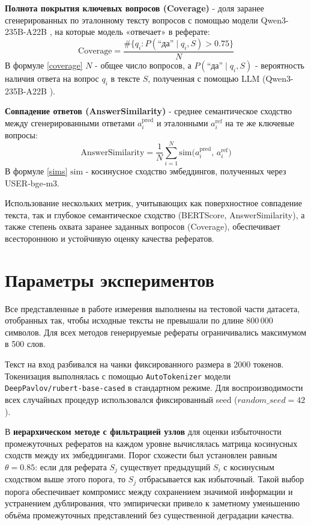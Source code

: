 \documentclass{superfri}
\begin{document}
\textbf{Полнота покрытия ключевых вопросов (Coverage)} - доля заранее сгенерированных по эталонному тексту вопросов с помощью модели Qwen3-\allowbreak 235B-\allowbreak A22B \cite{qwen3},
на которые модель «отвечает» в реферате:
\begin{equation}\label{coverage}
  \text{Coverage} = \frac{\#\{q_i\colon P(\text{“да”}\mid q_i,S)\!>\!0.75\}}{N}
\end{equation}
В формуле \eqref{coverage} $N$ - общее число вопросов, а $P(\text{“да”}\mid q_i,S)$ - вероятность наличия ответа на вопрос $q_i$ в тексте $S$, 
полученная с помощью LLM (Qwen3-\allowbreak 235B-\allowbreak A22B \cite{qwen3}).

\textbf{Совпадение ответов (AnswerSimilarity)} - среднее семантическое сходство между сгенерированными ответами $a_i^{\text{pred}}$ и эталонными $a_i^{\text{ref}}$ на те же ключевые вопросы:
\begin{equation}\label{sims}
  \text{AnswerSimilarity} = \frac{1}{N}\sum_{i=1}^N \mathrm{sim}\bigl(a_i^{\text{pred}},\,a_i^{\text{ref}}\bigr)
\end{equation}
В формуле \eqref{sims} $\mathrm{sim}$ - косинусное сходство эмбеддингов, полученных через USER‑bge‑m3.


Использование нескольких метрик, учитывающих как поверхностное совпадение текста, так и глубокое семантическое сходство (BERTScore, AnswerSimilarity), 
а также степень охвата заранее заданных вопросов (Coverage), обеспечивает всестороннюю и устойчивую оценку качества рефератов.

\section{Параметры экспериментов}

Все представленные в работе измерения выполнены на тестовой части датасета, 
отобранных так, чтобы исходные тексты не превышали по длине 800\,000 символов. 
Для всех методов генерируемые рефераты ограничивались максимумом в 500 слов.

Текст на вход разбивался на чанки фиксированного размера в 2000 токенов. 
Токенизация выполнялась с помощью \texttt{AutoTokenizer} модели \texttt{DeepPavlov/rubert-base-cased} в стандартном режиме.
Для воспроизводимости всех случайных процедур использовался фиксированный seed ($random\_seed = 42$).

В \textbf{иерархическом методе с фильтрацией узлов} для оценки избыточности промежуточных рефератов на каждом уровне вычислялась матрица косинусных сходств между их эмбеддингами.
Порог схожести был установлен равным $\theta=0.85$: если для реферата $S_j$ существует предыдущий $S_i$ с косинусным сходством выше этого порога, 
то $S_j$ отбрасывается как избыточный. Такой выбор порога обеспечивает компромисс между сохранением значимой информации и устранением дублирования, 
что эмпирически привело к заметному уменьшению объёма промежуточных представлений без существенной деградации качества.
\end{document}
